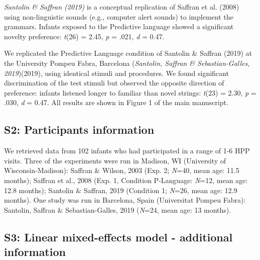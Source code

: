 \documentclass[english,man,man,floatsintext]{apa6}
\begin{document}
\begin{appendix}
\emph{Santolin \& Saffran (2019)} is a conceptual replication of Saffran
et al. (2008) using non-linguistic sounds (e.g., computer alert sounds)
to implement the grammars. Infants exposed to the Predictive language
showed a significant novelty preference: \emph{t}(26) = 2.45, \emph{p} =
.021, \emph{d} = 0.47.

We replicated the Predictive Language condition of Santolin \& Saffran
(2019) at the University Pompeu Fabra, Barcelona (\emph{Santolin,
Saffran \& Sebastian-Galles, 2019})(2019), using identical stimuli and
procedures. We found significant discrimination of the test stimuli but
observed the opposite direction of preference: infants listened longer
to familiar than novel strings: \emph{t}(23) = 2.30, \emph{p} = .030,
\emph{d} = 0.47. All results are shown in Figure 1 of the main
manuscript.

\hypertarget{s2-participants-information}{%
\subsection{S2: Participants
information}\label{s2-participants-information}}

We retrieved data from 102 infants who had participated in a range of
1-6 HPP visits. Three of the experiments were run in Madison, WI
(University of Wisconsin-Madison): Saffran \& Wilson, 2003 (Exp. 2;
\emph{N}=40, mean age: 11.5 months); Saffran et al., 2008 (Exp. 1,
Condition P-Language: \emph{N}=12, mean age: 12.8 months); Santolin \&
Saffran, 2019 (Condition 1; \emph{N}=26, mean age: 12.9 months). One
study was run in Barcelona, Spain (Universitat Pompeu Fabra): Santolin,
Saffran \& Sebastian-Galles, 2019 (\emph{N}=24, mean age: 13 months).

\hypertarget{s3-linear-mixed-effects-model---additional-information}{%
\subsection{S3: Linear mixed-effects model - additional
information}\label{s3-linear-mixed-effects-model---additional-information}}


\end{appendix}
\end{document}
